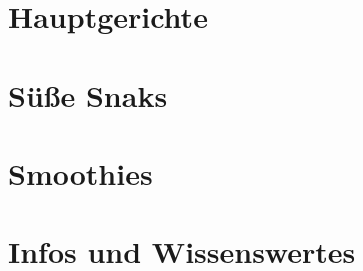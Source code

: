 \documentclass[a4paper]{scrartcl}
\begin{document}


\section{Hauptgerichte} %











\section{Süße Snaks} %







\section{Smoothies} %


\section{Infos und Wissenswertes} %
	

\end{document}
